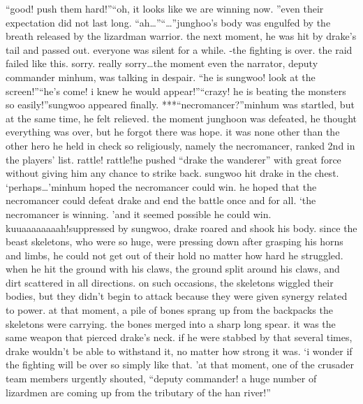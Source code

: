 “good! push them hard!”“oh, it looks like we are winning now.
”even their expectation did not last long.
“ah…”“…”junghoo’s body was engulfed by the breath released by the lizardman warrior.
 the next moment, he was hit by drake’s tail and passed out.
everyone was silent for a while.
-the fighting is over.
 the raid failed like this.
 sorry.
 really sorry…the moment even the narrator, deputy commander minhum, was talking in despair.
“he is sungwoo! look at the screen!”“he’s come! i knew he would appear!”“crazy! he is beating the monsters so easily!”sungwoo appeared finally.
***“necromancer?”minhum was startled, but at the same time, he felt relieved.
 the moment junghoon was defeated, he thought everything was over, but he forgot there was hope.
it was none other than the other hero he held in check so religiously, namely the necromancer, ranked 2nd in the players’ list.
rattle! rattle!he pushed “drake the wanderer” with great force without giving him any chance to strike back.
 sungwoo hit drake in the chest.
‘perhaps…’minhum hoped the necromancer could win.
 he hoped that the necromancer could defeat drake and end the battle once and for all.
‘the necromancer is winning.
’and it seemed possible he could win.
kuuaaaaaaaah!suppressed by sungwoo, drake roared and shook his body.
 since the beast skeletons, who were so huge, were pressing down after grasping his horns and limbs, he could not get out of their hold no matter how hard he struggled.
when he hit the ground with his claws, the ground split around his claws, and dirt scattered in all directions.
 on such occasions, the skeletons wiggled their bodies, but they didn’t begin to attack because they were given synergy related to power.
at that moment, a pile of bones sprang up from the backpacks the skeletons were carrying.
 the bones merged into a sharp long spear.
 it was the same weapon that pierced drake’s neck.
if he were stabbed by that several times, drake wouldn’t be able to withstand it, no matter how strong it was.
‘i wonder if the fighting will be over so simply like that.
’at that moment, one of the crusader team members urgently shouted, “deputy commander! a huge number of lizardmen are coming up from the tributary of the han river!”

